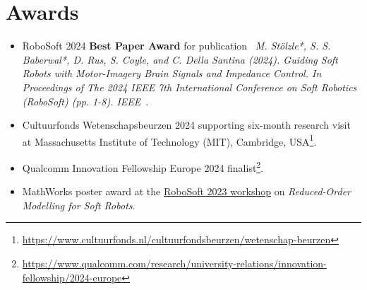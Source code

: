 \section*{Awards}
\begin{itemize}
    \item[\faTrophy] RoboSoft 2024 \textbf{Best Paper Award} for publication \faFileTextO \ \emph{M. Stölzle*, S. S. Baberwal*, D. Rus, S. Coyle, and C. Della Santina (2024). Guiding Soft Robots with Motor-Imagery Brain Signals and Impedance Control. In Proceedings of The 2024 IEEE 7th International Conference on Soft Robotics (RoboSoft) (pp. 1-8). IEEE}~\cite{stolzle2024guiding}.
    \item[\faTrophy] Cultuurfonds Wetenschapsbeurzen 2024 supporting six-month research visit at Massachusetts Institute of Technology (MIT), Cambridge, USA\footnote{\url{https://www.cultuurfonds.nl/cultuurfondsbeurzen/wetenschap-beurzen}}.
    \item[\faTrophy] Qualcomm Innovation Fellowship Europe 2024 finalist\footnote{\url{https://www.qualcomm.com/research/university-relations/innovation-fellowship/2024-europe}}.
    \item[\faTrophy] MathWorks poster award at the \href{https://sites.google.com/view/robosoft2023-workshop-rom/home}{RoboSoft 2023 workshop} on \emph{Reduced-Order Modelling for Soft Robots}.
\end{itemize}

